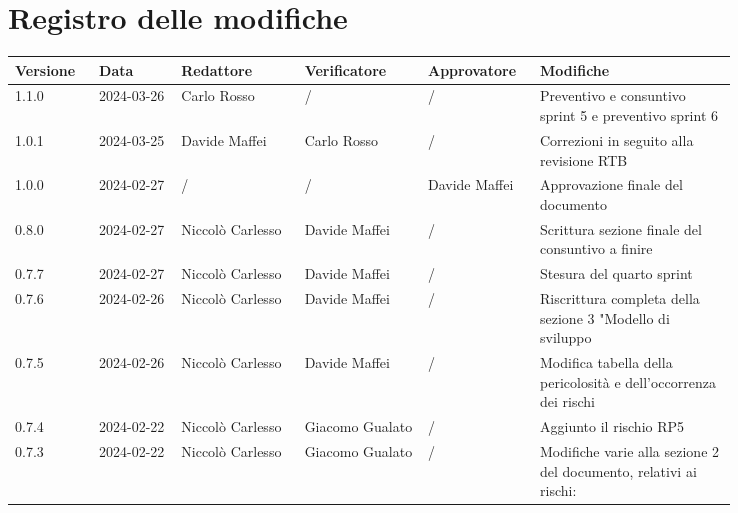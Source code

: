 \section*{Registro delle modifiche}
 {
  \renewcommand{\arraystretch}{1.5}
  \scriptsize
  \begin{longtable}{p{0.10\linewidth}p{0.10\linewidth}p{0.15\linewidth}p{0.15\linewidth}p{0.10\linewidth}p{0.24\linewidth}}
	  \textbf{Versione} & \textbf{Data} & \textbf{Redattore} & \textbf{Verificatore}  & \textbf{Approvatore} & \textbf{Modifiche}                                                \\
	  \toprule
	  1.1.0             & 2024-03-26    & Carlo Rosso        & /                      & /                    & Preventivo e consuntivo sprint 5 e preventivo sprint 6            \\
	  \hline
	  1.0.1             & 2024-03-25    & Davide Maffei      & Carlo Rosso            & /                    & Correzioni in seguito alla revisione RTB                          \\
	  \hline
	  1.0.0             & 2024-02-27    & /                  & /                      & Davide Maffei        & Approvazione finale del documento                                 \\
	  \hline
	  0.8.0             & 2024-02-27    & Niccolò Carlesso   & Davide Maffei          & /                    & Scrittura sezione finale del consuntivo a finire                  \\
	  \hline
	  0.7.7             & 2024-02-27    & Niccolò Carlesso   & Davide Maffei          & /                    & Stesura del quarto sprint                                         \\
	  \hline
	  0.7.6             & 2024-02-26    & Niccolò Carlesso   & Davide Maffei          & /                    & Riscrittura completa della sezione 3 "Modello di sviluppo         \\
	  \hline
	  0.7.5             & 2024-02-26    & Niccolò Carlesso   & Davide Maffei          & /                    & Modifica tabella della pericolosità e dell’occorrenza dei rischi  \\
	  \hline
	  0.7.4             & 2024-02-22    & Niccolò Carlesso   & Giacomo Gualato        & /                    & Aggiunto il rischio RP5                                           \\
	  \hline
	  0.7.3             & 2024-02-22    & Niccolò Carlesso   & Giacomo Gualato        & /                    & Modifiche varie alla sezione 2 del documento, relativi ai rischi:

\end{longtable}}
